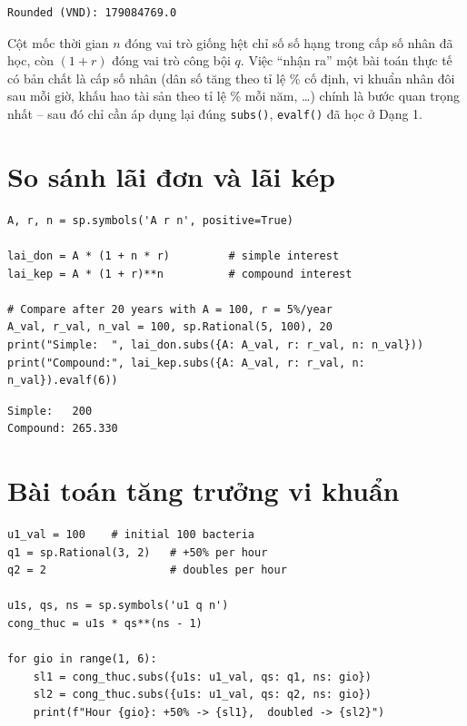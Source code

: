 \documentclass[12pt,a4paper]{report}
\begin{document}
\begin{lstlisting}[style=outstyle,numbers=none]
Rounded (VND): 179084769.0
\end{lstlisting}

\begin{infobox}
Cột mốc thời gian $n$ đóng vai trò giống hệt chỉ số số hạng trong cấp
số nhân đã học, còn $(1+r)$ đóng vai trò công bội $q$. Việc ``nhận ra''
một bài toán thực tế có bản chất là cấp số nhân (dân số tăng theo tỉ lệ
\% cố định, vi khuẩn nhân đôi sau mỗi giờ, khấu hao tài sản theo tỉ lệ
\% mỗi năm, \dots) chính là bước quan trọng nhất -- sau đó chỉ cần áp
dụng lại đúng \texttt{subs()}, \texttt{evalf()} đã học ở Dạng 1.
\end{infobox}

\section{So sánh lãi đơn và lãi kép}

\begin{lstlisting}[caption={So sánh lãi đơn (cấp số cộng) và lãi kép (cấp số nhân)}]
A, r, n = sp.symbols('A r n', positive=True)

lai_don = A * (1 + n * r)         # simple interest
lai_kep = A * (1 + r)**n          # compound interest

# Compare after 20 years with A = 100, r = 5%/year
A_val, r_val, n_val = 100, sp.Rational(5, 100), 20
print("Simple:  ", lai_don.subs({A: A_val, r: r_val, n: n_val}))
print("Compound:", lai_kep.subs({A: A_val, r: r_val, n: n_val}).evalf(6))
\end{lstlisting}

\begin{lstlisting}[style=outstyle,caption={Kết quả}]
Simple:   200
Compound: 265.330
\end{lstlisting}

\section{Bài toán tăng trưởng vi khuẩn}

\begin{lstlisting}[caption={So sánh tăng trưởng vi khuẩn với hai tốc độ}]
u1_val = 100    # initial 100 bacteria
q1 = sp.Rational(3, 2)   # +50% per hour
q2 = 2                   # doubles per hour

u1s, qs, ns = sp.symbols('u1 q n')
cong_thuc = u1s * qs**(ns - 1)

for gio in range(1, 6):
    sl1 = cong_thuc.subs({u1s: u1_val, qs: q1, ns: gio})
    sl2 = cong_thuc.subs({u1s: u1_val, qs: q2, ns: gio})
    print(f"Hour {gio}: +50% -> {sl1},  doubled -> {sl2}")
\end{lstlisting}
\end{document}
